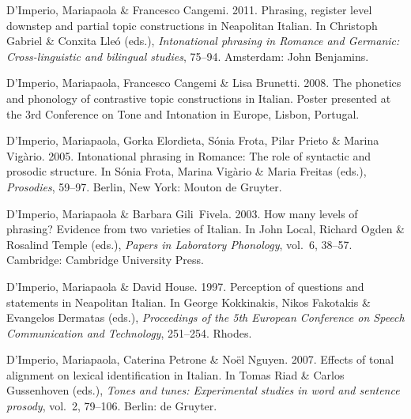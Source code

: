 \documentclass[ number=1
,series=labphon
,output=long
,url=http://langsci-press.org/catalog/book/16
,isbn=978-3-944675-01-5
]{LSP/langsci}
\begin{document}
\begin{thebibliography}{284}
\enlargethispage{\baselineskip}
D'Imperio, Mariapaola \& Francesco Cangemi. 2011.
\newblock Phrasing, register level downstep and partial topic constructions in
  {N}eapolitan {I}talian.
\newblock In Christoph Gabriel \& Conxita Lle\'{o} (eds.), \emph{Intonational
  phrasing in {R}omance and {G}ermanic: {C}ross-linguistic and bilingual
  studies}, 75--94. Amsterdam: John Benjamins.

D'Imperio, Mariapaola, Francesco Cangemi \& Lisa Brunetti. 2008.
\newblock The phonetics and phonology of contrastive topic constructions in
  {I}talian.
\newblock Poster presented at the 3rd Conference on Tone and Intonation in
  Europe, Lisbon, Portugal.

D'Imperio, Mariapaola, Gorka Elordieta, Sónia Frota, Pilar Prieto \& Marina
  Vig\`{a}rio. 2005.
\newblock Intonational phrasing in {R}omance: {T}he role of syntactic and
  prosodic structure.
\newblock In Sónia Frota, Marina Vig\`{a}rio \& Maria Freitas (eds.),
  \emph{Prosodies}, 59--97. Berlin, New York: Mouton de Gruyter.

D'Imperio, Mariapaola \& Barbara Gili~Fivela. 2003.
\newblock How many levels of phrasing? {E}vidence from two varieties of
  {I}talian.
\newblock In John Local, Richard Ogden \& Rosalind Temple (eds.), \emph{Papers
  in {L}aboratory {P}honology}, vol.~6, 38--57. Cambridge: Cambridge University
  Press.

D'Imperio, Mariapaola \& David House. 1997.
\newblock Perception of questions and statements in {N}eapolitan {I}talian.
\newblock In George Kokkinakis, Nikos Fakotakis \& Evangelos Dermatas (eds.),
  \emph{Proceedings of the 5th {European Conference on Speech Communication and
  Technology}}, 251--254. Rhodes.

D'Imperio, Mariapaola, Caterina Petrone \& Noël Nguyen. 2007.
\newblock Effects of tonal alignment on lexical identification in {I}talian.
\newblock In Tomas Riad \& Carlos Gussenhoven (eds.), \emph{Tones and tunes:
  {E}xperimental studies in word and sentence prosody}, vol.~2, 79--106.
  Berlin: de Gruyter.


\end{thebibliography}
\end{document}
